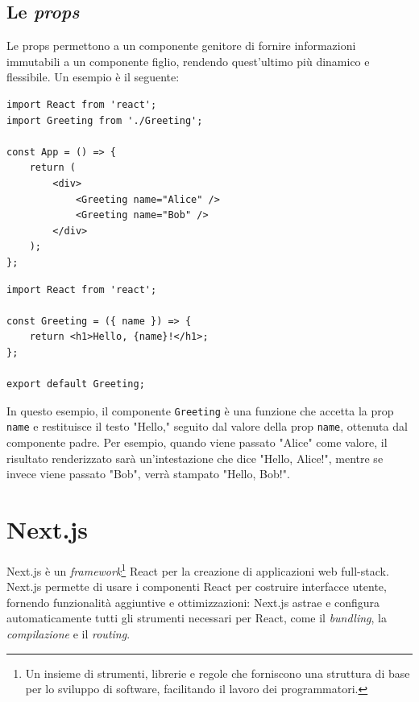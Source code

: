 \documentclass[target=bach,aauheader=,style=]{thud}
\begin{document}
\subsection{Le \textit{props}}
Le props permettono a un componente genitore di fornire informazioni immutabili a un componente figlio, rendendo quest'ultimo più dinamico e flessibile. Un esempio è il seguente:

\begin{minipage}[t]{0.45\textwidth}
    \begin{lstlisting}[caption=Componente genitore]
import React from 'react';
import Greeting from './Greeting';

const App = () => {
    return (
        <div>
            <Greeting name="Alice" />
            <Greeting name="Bob" />
        </div>
    );
};  
    \end{lstlisting}
\end{minipage}
\hfill
\begin{minipage}[t]{0.45\textwidth}
    \begin{lstlisting}[caption=Componente figlio]
import React from 'react';

const Greeting = ({ name }) => {
    return <h1>Hello, {name}!</h1>;
};

export default Greeting;
    \end{lstlisting}
\end{minipage}

\noindent In questo esempio, il componente \texttt{Greeting} è una funzione che accetta la prop \texttt{name} e restituisce il testo  "Hello," seguito dal valore della prop \texttt{name}, ottenuta dal componente padre. Per esempio, quando viene passato "Alice" come valore, il risultato renderizzato sarà un'intestazione che dice "Hello, Alice!", mentre se invece viene passato "Bob", verrà stampato "Hello, Bob!".

\section{Next.js}
Next.js \cite{nextjsdocs2024} è un \textit{framework}\footnote{Un insieme di strumenti, librerie e regole che forniscono una struttura di base per lo sviluppo di software, facilitando il lavoro dei programmatori.} React per la creazione di applicazioni web full-stack. Next.js permette di usare i componenti React per costruire interfacce utente, fornendo funzionalità aggiuntive e ottimizzazioni: Next.js astrae e configura automaticamente tutti gli strumenti necessari per React, come il \textit{bundling}, la \textit{compilazione} e il \textit{routing}.
\end{document}
